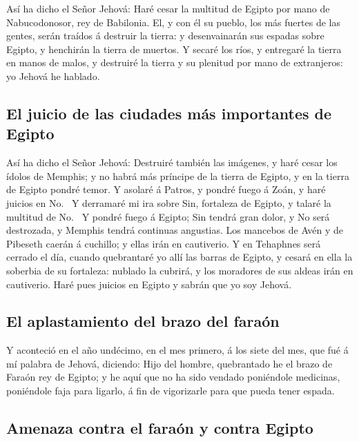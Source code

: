  Así ha dicho el Señor Jehová: Haré cesar la multitud de
Egipto por mano de Nabucodonosor, rey de Babilonia.  El,
y con él su pueblo, los más fuertes de las gentes, serán traídos á
destruir la tierra: y desenvainarán sus espadas sobre Egipto, y
henchirán la tierra de muertos.  Y secaré los ríos, y
entregaré la tierra en manos de malos, y destruiré la tierra y su
plenitud por mano de extranjeros: yo Jehová he hablado.

\hypertarget{el-juicio-de-las-ciudades-muxe1s-importantes-de-egipto}{%
\subsection{El juicio de las ciudades más importantes de
Egipto}\label{el-juicio-de-las-ciudades-muxe1s-importantes-de-egipto}}

 Así ha dicho el Señor Jehová: Destruiré también las
imágenes, y haré cesar los ídolos de Memphis; y no habrá más príncipe de
la tierra de Egipto, y en la tierra de Egipto pondré temor.
 Y asolaré á Patros, y pondré fuego á Zoán, y haré
juicios en No.~ Y derramaré mi ira sobre Sin, fortaleza
de Egipto, y talaré la multitud de No.~ Y pondré fuego á
Egipto; Sin tendrá gran dolor, y No será destrozada, y Memphis tendrá
continuas angustias.  Los mancebos de Avén y de Pibeseth
caerán á cuchillo; y ellas irán en cautiverio.  Y en
Tehaphnes será cerrado el día, cuando quebrantaré yo allí las barras de
Egipto, y cesará en ella la soberbia de su fortaleza: nublado la
cubrirá, y los moradores de sus aldeas irán en cautiverio.
 Haré pues juicios en Egipto y sabrán que yo soy Jehová.

\hypertarget{el-aplastamiento-del-brazo-del-farauxf3n}{%
\subsection{El aplastamiento del brazo del
faraón}\label{el-aplastamiento-del-brazo-del-farauxf3n}}

 Y aconteció en el año undécimo, en el mes primero, á los
siete del mes, que fué á mí palabra de Jehová, diciendo: 
Hijo del hombre, quebrantado he el brazo de Faraón rey de Egipto; y he
aquí que no ha sido vendado poniéndole medicinas, poniéndole faja para
ligarlo, á fin de vigorizarle para que pueda tener espada.

\hypertarget{amenaza-contra-el-farauxf3n-y-contra-egipto}{%
\subsection{Amenaza contra el faraón y contra
Egipto}\label{amenaza-contra-el-farauxf3n-y-contra-egipto}}

